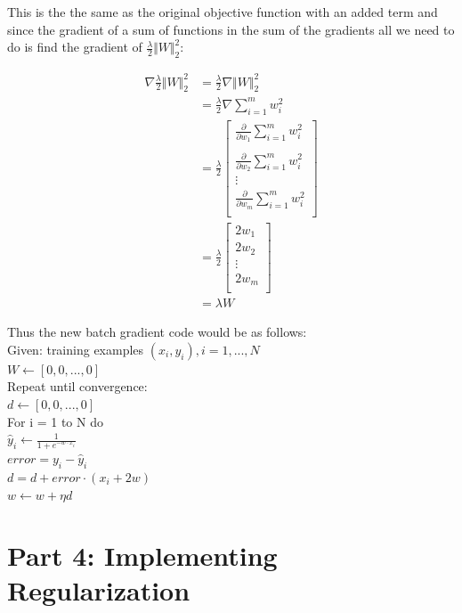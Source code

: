 \documentclass{article}
\newcommand\tab[1][1cm]{\hspace*{#1}}
\begin{document}
	This is the the same as the original objective function with an added term and since the gradient of a sum of functions in the sum of the gradients all we need to do is find the gradient of $\frac{\lambda}{2} \Vert W \Vert_{2}^{2}$:
	
	\begin{align}
	\nabla \frac{\lambda}{2} \Vert W \Vert_{2}^{2} &= \frac{\lambda}{2} \nabla \Vert W \Vert_{2}^{2} \\
	 &= \frac{\lambda}{2} \nabla \sum_{i = 1}^{m} w_{i}^{2} \\
	 &= \frac{\lambda}{2} \begin{bmatrix}
		 \frac{\partial}{\partial w_{1}} \sum_{i = 1}^{m} w_{i}^{2} \\ \\
		 \frac{\partial}{\partial w_{2}} \sum_{i = 1}^{m} w_{i}^{2} \\
		 \vdots \\
		 \frac{\partial}{\partial w_{m}} \sum_{i = 1}^{m} w_{i}^{2} \\
		 \end{bmatrix}\\
	&= \frac{\lambda}{2} \begin{bmatrix}
	2 w_{1} \\
	2 w_{2} \\
	\vdots \\
	2 w_{m} \\
	 \end{bmatrix}\\
	&= \lambda W
	\end{align}
	
Thus the new batch gradient code would be as follows:\\
Given: training examples $(x_{i}, y_{i}), i = 1, ..., N$ \\
$W \leftarrow [0, 0, ..., 0]$ \\
Repeat until convergence: \\
\tab $ d \leftarrow [0, 0, ..., 0]$ \\
\tab For i = 1 to N do \\
\tab \tab $\hat{y}_{i} \leftarrow \frac{1}{1 + e^{-w \cdot x_{i}}}$ \\
\tab \tab $error = y_{i} - \hat{y}_{i}$ \\
\tab \tab $d = d + error \cdot (x_{i} + 2 w)$ \\
\tab $w \leftarrow w + \eta d$
		


	
	\section*{Part 4: Implementing Regularization}
	
\end{document}
